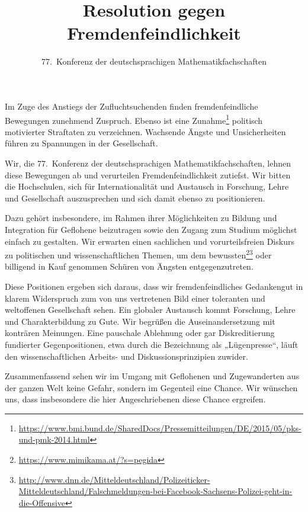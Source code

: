 \documentclass[12pt,a4paper,ngerman,DIV=14,draft]{scrartcl}
\author{77.~Konferenz der deutschsprachigen Mathematikfachschaften}
\title{Resolution gegen Fremdenfeindlichkeit}
\begin{document}
\maketitle{}


Im Zuge des Anstiegs der Zufluchtsuchenden finden fremdenfeindliche
Bewegungen zunehmend Zuspruch. Ebenso ist eine
Zunahme\footnote{\url{https://www.bmi.bund.de/SharedDocs/Pressemitteilungen/DE/2015/05/pks-und-pmk-2014.html}}
politisch motivierter Straftaten zu verzeichnen. Wachsende Ängste und
Unsicherheiten führen zu Spannungen in der Gesellschaft.

Wir, die 77.~Konferenz der deutschsprachigen Mathematikfachschaften,
lehnen diese Bewegungen ab und verurteilen Fremdenfeindlichkeit
zutiefst. Wir bitten die Hochschulen, sich für Internationalität und
Austausch in Forschung, Lehre und Gesellschaft auszusprechen und sich
damit ebenso zu positionieren.

Dazu gehört insbesondere, im Rahmen ihrer Möglichkeiten zu Bildung und
Integration für Geflohene beizutragen sowie den Zugang zum Studium
möglichst einfach zu gestalten. Wir erwarten einen sachlichen und
vorurteilsfreien Diskurs zu politischen und wissenschaftlichen Themen,
um dem
bewussten\footnote{\url{https://www.mimikama.at/?s=pegida}}\footnote{\url{http://www.dnn.de/Mitteldeutschland/Polizeiticker-Mitteldeutschland/Falschmeldungen-bei-Facebook-Sachsens-Polizei-geht-in-die-Offensive}}
oder billigend in Kauf genommen Schüren von Ängsten entgegenzutreten.

Diese Positionen ergeben sich daraus, dass wir fremdenfeindliches
Gedankengut in klarem Widerspruch zum von uns vertretenen Bild einer
toleranten und weltoffenen Gesellschaft sehen. Ein globaler Austausch
kommt Forschung, Lehre und Charakterbildung zu Gute. Wir begrüßen die
Auseinandersetzung mit konträren Meinungen. Eine pauschale Ablehnung
oder gar Diskreditierung fundierter Gegenpositionen, etwa durch die
Bezeichnung als „Lügenpresse“, läuft den wissenschaftlichen Arbeits-
und Diskussionsprinzipien zuwider.

Zusammenfassend sehen wir im Umgang mit Geflohenen und Zugewanderten
aus der ganzen Welt keine Gefahr, sondern im Gegenteil eine
Chance. Wir wünschen uns, dass insbesondere die hier Angeschriebenen
diese Chance ergreifen.
\end{document}
